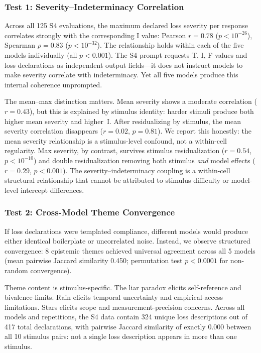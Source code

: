 \subsubsection{Test 1: Severity--Indeterminacy Correlation}

Across all 125 S4 evaluations, the maximum declared loss severity per
response correlates strongly with the corresponding I value: Pearson
$r = 0.78$ ($p < 10^{-26}$), Spearman $\rho = 0.83$
($p < 10^{-32}$).  The relationship holds within each of the five
models individually (all $p < 0.001$).  The S4 prompt requests T, I, F
values and loss declarations as independent output fields---it does not
instruct models to make severity correlate with indeterminacy.  Yet all
five models produce this internal coherence unprompted.

The mean--max distinction matters.  Mean severity shows a moderate
correlation ($r = 0.43$), but this is explained by stimulus identity:
harder stimuli produce both higher mean severity and higher~I.  After
residualizing by stimulus, the mean severity correlation disappears
($r = 0.02$, $p = 0.81$).  We report this honestly: the mean
severity relationship is a stimulus-level confound, not a within-cell
regularity.  Max severity, by contrast, survives stimulus
residualization ($r = 0.54$, $p < 10^{-10}$) and double
residualization removing both stimulus \emph{and} model effects
($r = 0.29$, $p < 0.001$).  The severity--indeterminacy coupling is
a within-cell structural relationship that cannot be attributed to
stimulus difficulty or model-level intercept differences.

\subsubsection{Test 2: Cross-Model Theme Convergence}

If loss declarations were templated compliance, different models would
produce either identical boilerplate or uncorrelated noise.  Instead, we
observe structured convergence: 8 epistemic themes achieved universal
agreement across all 5 models (mean pairwise Jaccard similarity 0.450;
permutation test $p < 0.0001$ for non-random convergence).

Theme content is stimulus-specific.  The liar paradox elicits
self-reference and bivalence-limits.  Rain elicits temporal uncertainty
and empirical-access limitations.  Stars elicits scope and
measurement-precision concerns.  Across all models and repetitions, the
S4 data contain 324 unique loss descriptions out of 417 total
declarations, with pairwise Jaccard similarity of exactly 0.000 between
all 10 stimulus pairs: not a single loss description appears in more
than one stimulus.

